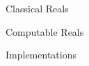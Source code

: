 \documentclass[12pt]{PalisadesLakesBook}
\begin{document}
\begin{plSection}{Classical Reals}


\end{plSection}%
\begin{plSection}{Computable Reals}

\begin{plSection}{Implementations}
\end{plSection}%
\end{plSection}%
\BeginAppendices

\end{document}
